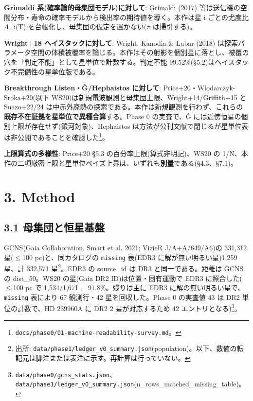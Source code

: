 \documentclass[11pt]{article}
\begin{document}
\noindent \textbf{Grimaldi 系(確率論的母集団モデル)に対して}: Grimaldi (2017) 等は送信機の空間分布・寿命の確率モデルから検出率の期待値を導く。本作は星 i ごとの尤度比 \(\Lambda\)\_i(T) を台帳化し、母集団の仮定を置かない(\(\pi\) は掃引する)。\par\smallskip
\noindent \textbf{Wright+18 ヘイスタックに対して}: Wright, Kanodia \& Lubar (2018) は探索パラメータ空間の体積被覆率を論じる。本作はその射影を個別星に落とし、被覆の穴を「判定不能」として星単位で計数する。判定不能 99.52\%(\S{}5.2)はヘイスタック不完備性の星単位版である。\par\smallskip
\noindent \textbf{Breakthrough Listen・\^{G}/Hephaistos に対して}: Price+20・Wlodarczyk-Sroka+20(以下 WS20)は新規電波観測と母集団上限、Wright+14/Griffith+15 と Suazo+22/24 は中赤外廃熱の探索である。本作は新規観測を行わず、これらの\textbf{既存不在証拠を星単位で異種合算}する。Phase 0 の実査で、\^{G} には近傍恒星の個別上限が存在せず(銀河対象)、Hephaistos は方法が公刊文献で閉じるが星単位表は非公開であることを確認した\footnote{\texttt{docs/phase0/01-machine-readability-survey.md}。}。\par\smallskip
\noindent \textbf{上限算式の多様性}: Price+20 \S{}5.3 の百分率上限(算式非明記)、WS20 の 1/N、本作の二項厳密上限と星単位ベイズ上界は、いずれも\textbf{別量}である(\S{}4.3、\S{}7.1)。\par\smallskip


\section*{3. Method}

\subsection*{3.1 母集団と恒星基盤}
\noindent GCNS(Gaia Collaboration, Smart et al. 2021; VizieR J/A+A/649/A6)の 331,312 星(\(\leq\)100 pc)と、同カタログの \texttt{missing} 表(EDR3 に解が無い明るい星)1,259 星、計 332,571 星\footnote{出所: \texttt{data/phase1/ledger\_v0\_summary.json}(population)。以下、数値の転記元は脚注または表注に示す。再計算は行っていない。}。EDR3 の source\_id は DR3 と同一である。距離は GCNS の dist\_50。WS20 の星(Gaia DR2 ID)は位置・固有運動で EDR3 に照合した(\(\leq\)100 pc で 1,534/1,671 = 91.8\%。残りは主に EDR3 に解の無い明るい星で、\texttt{missing} 表により 67 観測行・42 星を回収した。Phase 0 の実査値 43 は DR2 単位の計数で、HD 239960A に DR2 2 星が対応するため 42 エントリとなる)\footnote{\texttt{data/phase0/gcns\_stats.json}、\texttt{data/phase1/ledger\_v0\_summary.json}(n\_rows\_matched\_missing\_table)。}。\par\smallskip
\end{document}

